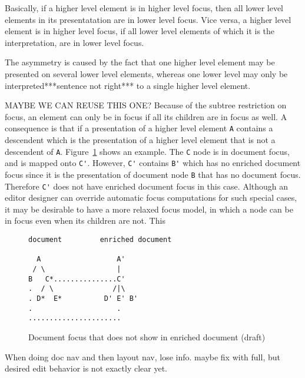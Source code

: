 Basically, if a higher level element is in higher level focus, then all lower level elements in its presentatation are in lower level focus. Vice versa, a higher level element is in higher level focus, if all lower level elements of which it is the interpretation, are in lower level focus. 

\bc
The asymmetry is caused by the fact that one higher level element may be presented on several lower level elements, whereas one lower level may only be interpreted***sentence not right*** to a single higher level element.
\ec

\bc MAYBE WE CAN REUSE THIS ONE?
Because of the subtree restriction on focus, an element can only be in focus if all its children are in focus as well.  A consequence is that if a presentation of a higher level element \verb|A| contains a descendent which is the presentation of a higher level element that is not a descendent of \verb|A|. Figure~\ref{unpresentableFocus} shows an example. The \verb|C| node is in document focus, and is mapped onto \verb|C'|. However, \verb|C'| contains \verb|B'| which has no enriched document focus since it is the presentation of document node \verb|B| that has no document focus. Therefore \verb|C'| does not have enriched document focus in this case. Although an editor designer can override automatic focus computations for such special cases, it may be desirable to have a more relaxed focus model, in which a node can be in focus even when its children are not. This 

\begin{figure}
\begin{small}
\begin{center}
\begin{verbatim}
document         enriched document

  A                  A'
 / \                 |
B   C*...............C'
.  / \              /|\
. D*  E*          D' E' B'
.                    .
......................    
\end{verbatim}
\caption{Document focus that does not show in enriched document (draft)}\label{unpresentableFocus} 
\end{center}
\end{small}
\end{figure}
\ec

\bc When doing doc nav and then layout nav, lose info. maybe fix with full, but desired edit behavior is not exactly clear yet.
\ec

